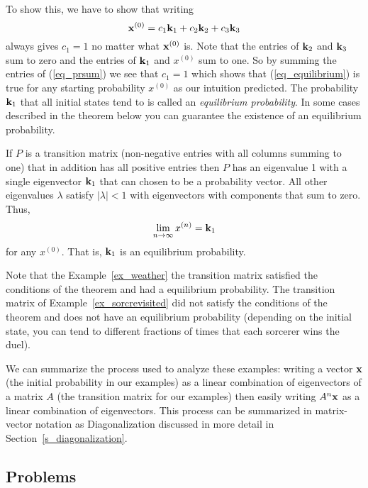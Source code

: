 To show this, we have to show that writing 
\begin{equation}
\label{eq_prsum}
{\bf x}^{(0)} = c_1 {\bf k}_1 + c_2 {\bf k}_2 + c_3 {\bf k}_3
\end{equation} 
always gives $c_1 =1$ no matter what ${\bf x}^{(0)}$ is. Note that the entries 
of ${\bf k}_2$ and ${\bf k}_3$ sum to zero and the entries of ${\bf k}_1$ and $x^{(0)}$ 
sum to one. So by summing the entries of (\ref{eq_prsum}) we see that 
$c_1 = 1$ which shows that (\ref{eq_equilibrium}) is true for 
any starting probability $x^{(0)}$ as our intuition predicted. 
The probability ${\bf k}_1$ that all initial states tend to is called an 
{\em equilibrium probability}. In some cases described in the theorem 
below you can guarantee the existence of an equilibrium probability. 

\begin{theorem}
\label{thm:eq_probability}
If $P$ is a transition matrix (non-negative entries with
all columns summing to one) that in addition has all positive entries 
then $P$ has an eigenvalue 1 with a single eigenvector ${\bf k}_1$ that can 
chosen to be a probability vector. All other eigenvalues $\lambda$ 
satisfy $|\lambda|<1$ with eigenvectors with components that sum to 
zero. Thus, 
\[
\lim_{n \rightarrow \infty} x^{(n)} = {\bf k}_1
\]
for any $x^{(0)}$. That is, ${\bf k}_1$ is an equilibrium probability. 
\end{theorem} 

Note that the Example~\ref{ex_weather} the transition matrix satisfied the 
conditions of the theorem and had a equilibrium probability.
The transition matrix of Example~\ref{ex_sorcrevisited} did not 
satisfy the conditions of the theorem and does not have an 
equilibrium probability (depending on the initial state, you can tend 
to different fractions of times that each sorcerer wins the duel). 

We can summarize the process used to analyze these examples: 
writing a vector ${\bf x}$ 
(the initial probability in our examples) 
as a linear combination of eigenvectors of a matrix $A$ (the 
transition matrix for our examples) then easily writing 
$A^n {\bf x}$ as a linear combination of eigenvectors. This process 
can be summarized in matrix-vector notation as Diagonalization discussed 
in more detail in Section~\ref{s_diagonalization}.

\subsection{Problems}

